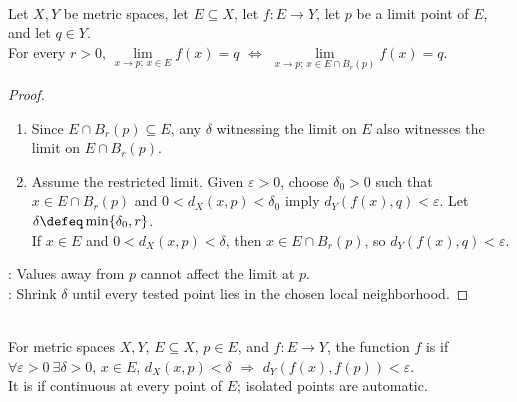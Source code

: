 \begin{proposition} \label{prop:function-limits-are-local} \\
Let $X,Y$ be metric spaces, let $E\subseteq X$, let $f:E\to Y$, let $p$ be a limit point of $E$, and let $q\in Y$.\\
For every $r>0$, $\lim\limits_{x\to p;\,x\in E}f(x)=q$ $\Longleftrightarrow$ $\lim\limits_{x\to p;\,x\in E\cap B_r(p)}f(x)=q$.
\begin{proof}
\begin{enumerate}[label=\roman*.]
\setlength{\itemsep}{0pt}
\item[$(\Rightarrow)$] Since $E\cap B_r(p)\subseteq E$, any $\delta$ witnessing the limit on $E$ also witnesses the limit on $E\cap B_r(p)$.
\item[$(\Leftarrow)$] Assume the restricted limit. Given $\varepsilon>0$, choose $\delta_0>0$ such that $x\in E\cap B_r(p)$ and $0<d_X(x,p)<\delta_0$ imply $d_Y(f(x),q)<\varepsilon$. Let $\delta\defeq\min\{\delta_0,r\}$.\\
If $x\in E$ and $0<d_X(x,p)<\delta$, then $x\in E\cap B_r(p)$, so $d_Y(f(x),q)<\varepsilon$.
\end{enumerate}
: Values away from $p$ cannot affect the limit at $p$.\\
: Shrink $\delta$ until every tested point lies in the chosen local neighborhood.
\end{proof}
\end{proposition}

\begin{definition} \label{def:continuity-at-a-point-and-on-a-set} \\
For metric spaces $X,Y$, $E\subseteq X$, $p\in E$, and $f:E\to Y$, the function $f$ is  if $\forall \varepsilon>0\ \exists \delta>0$, $x\in E$, $d_X(x,p)<\delta$ $\Longrightarrow$ $d_Y(f(x),f(p))<\varepsilon$.\\
It is  if continuous at every point of $E$; isolated points are automatic.
\end{definition}

